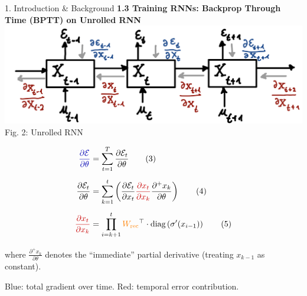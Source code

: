 \documentclass[final]{beamer}
\begin{document}
\begin{frame}[t]
\begin{columns}[t,totalwidth=\textwidth]
\begin{column}{0.33\textwidth}
\begin{block}{1. Introduction \& Background}
        \vspace{1em}
        \textbf{1.3 Training RNNs: Backprop Through Time (BPTT) on Unrolled RNN}\\
        \includegraphics[width=0.95\linewidth]{figures/2_fig.png}\\[0.5em]
        Fig. 2: Unrolled RNN


        \vspace{0.3em}
        \begin{align*}
          \textcolor{myblue}{\frac{\partial \mathcal{E}}{\partial \theta}} &=
          \sum_{t=1}^{T} \frac{\partial \mathcal{E}_t}{\partial \theta} \hspace{2em} \text{(3)} \\[0.5em]
          \frac{\partial \mathcal{E}_t}{\partial \theta} &=
          \sum_{k=1}^{t} 
          \left( {\frac{\partial \mathcal{E}_t}{\partial x_t}} 
          \textcolor{myred}{\frac{\partial x_t}{\partial x_k}}
          \frac{\partial^+ x_k}{\partial \theta} \right) \hspace{2em} \text{(4)} \\[0.5em]
          \textcolor{myred}{\frac{\partial x_t}{\partial x_k}} &=
          \prod_{i=k+1}^{t}
          \textcolor{orange}{W_{\text{rec}}}^\top \cdot \text{diag}\left(\sigma'(x_{i-1})\right) \hspace{2em} \text{(5)}
        \end{align*}
        
        \vspace{0.5em}
        where $\frac{\partial^+ x_k}{\partial \theta}$ denotes the “immediate” partial derivative (treating $x_{k-1}$ as constant).
        
        \vspace{0.5em}
        \textcolor{myblue}{Blue}: total gradient over time.
        \quad
        \textcolor{myred}{Red}: temporal error contribution.

      \end{block}
    \end{column}



\end{columns}
\end{frame}
\end{document}
